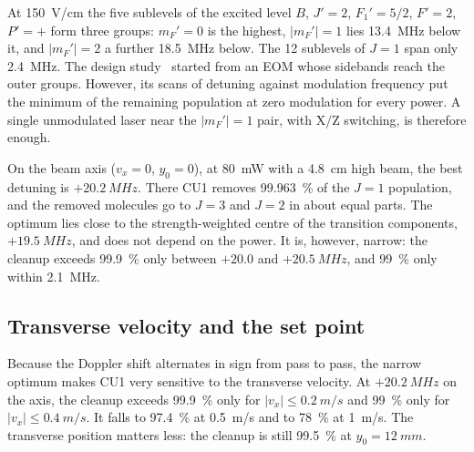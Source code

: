 \documentclass[11pt,a4paper,oneside]{report}
\begin{document}
At \SI{150}{V/cm} the five sublevels of the excited level $B$, $J'=2$, $F_1'=5/2$, $F'=2$, $P'=+$
form three groups: $m_F'=0$ is the highest, $|m_F'|=1$ lies \SI{13.4}{MHz} below it, and $|m_F'|=2$
a further \SI{18.5}{MHz} below. The 12 sublevels of $J=1$ span only \SI{2.4}{MHz}. The design
study~\cite{CleanupTheory2024} started from an EOM whose sidebands reach the outer groups. However,
its scans of detuning against modulation frequency put the minimum of the remaining population at
zero modulation for every power. A single unmodulated laser near the $|m_F'|=1$ pair, with X/Z
switching, is therefore enough.

On the beam axis ($v_x=0$, $y_0=0$), at \SI{80}{mW} with a \SI{4.8}{cm} high beam, the best
detuning is $+\SI{20.2}{MHz}$. There CU1 removes \SI{99.963}{\percent} of the $J=1$ population, and
the removed molecules go to $J=3$ and $J=2$ in about equal parts. The optimum lies close to the
strength-weighted centre of the transition components, $+\SI{19.5}{MHz}$, and does not depend on
the power. It is, however, narrow: the cleanup exceeds \SI{99.9}{\percent} only between $+20.0$ and
$+\SI{20.5}{MHz}$, and \SI{99}{\percent} only within \SI{2.1}{MHz}.

\subsection{Transverse velocity and the set point}
\label{sec:cu1_set}

Because the Doppler shift alternates in sign from pass to pass, the narrow optimum makes CU1 very
sensitive to the transverse velocity. At $+\SI{20.2}{MHz}$ on the axis, the cleanup exceeds
\SI{99.9}{\percent} only for $|v_x|\leq\SI{0.2}{m/s}$ and \SI{99}{\percent} only for
$|v_x|\leq\SI{0.4}{m/s}$. It falls to \SI{97.4}{\percent} at \SI{0.5}{m/s} and to \SI{78}{\percent}
at \SI{1}{m/s}. The transverse position matters less: the cleanup is still \SI{99.5}{\percent} at
$y_0=\SI{12}{mm}$.
\end{document}
